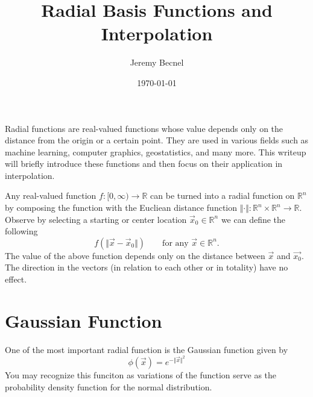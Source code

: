 \documentclass{article}
\title{Radial Basis Functions and Interpolation}
\author{Jeremy Becnel}
\date{\today}
\begin{document}
\maketitle
Radial  functions are real-valued functions whose value depends only on the distance 
from the origin or a certain point. 
They are used in various fields such as machine learning, 
computer graphics, geostatistics, and many more. 
This writeup will briefly introduce these functions and then focus on their application in interpolation.

Any real-valued function $f:[0,\infty) \to \mathbb{R}$ can be turned into a radial function on $\mathbb{R}^n$
by composing the function with the Eucliean distance function
 $\Vert \cdot \Vert : \mathbb{R}^n \times \mathbb{R}^n \to \mathbb{R}$.
Observe by selecting a starting or center location $\vec{x}_0 \in \mathbb{R}^n$ we can define the following
\[
f(\Vert \vec{x} - \vec{x}_0 \Vert ) \qquad \text{for any $\vec{x} \in \mathbb{R}^n$.}   
\]
The value of the above function depends only on the distance between $\vec{x}$ and $\vec{x_0}$. 
The direction in the vectors
(in relation to each other or in totality) have no effect. 


\section*{Gaussian Function}
One of the most important radial function is the Gaussian function given by 
\[
\phi(\vec{x}) = e^{-\Vert \vec{x} \Vert^2}
\]
You may recognize this funciton as variations of the function serve as the probability density function for the
normal distribution. 
\end{document}
